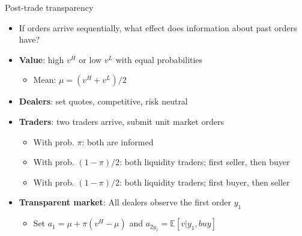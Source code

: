 \documentclass[english,10pt
,aspectratio=169
]{beamer}
\begin{document}
\begin{frame}{Post-trade transparency}
	\begin{itemize}
		\item If orders arrive sequentially, what effect does information about \alert{past orders} have?
		\item \textbf{Value}: high $v^H$ or low $v^L$ with equal probabilities
		\begin{itemize}
			\item Mean: $\mu=(v^H+v^L)/2$
		\end{itemize}
		\item \textbf{Dealers}: set quotes, competitive, risk neutral
		\item \textbf{Traders}: two traders arrive, submit unit market orders
		\begin{itemize}
			\item With prob. $\pi$: both are informed
			\item With prob. $(1-\pi)/2$: both liquidity traders;  first  seller, then buyer
			\item With prob. $(1-\pi)/2$: both liquidity traders;  first  buyer, then seller
		\end{itemize}
		\item \textbf{Transparent market}: All dealers observe the first order $y_1$
		\begin{itemize}
			\item Set $a_1=\mu+\pi(v^{H}-\mu)$ and $a_{2y_1}=\mathbb{E}[v|y_1,buy]$
		\end{itemize}
	\end{itemize}
\end{frame}
\end{document}
